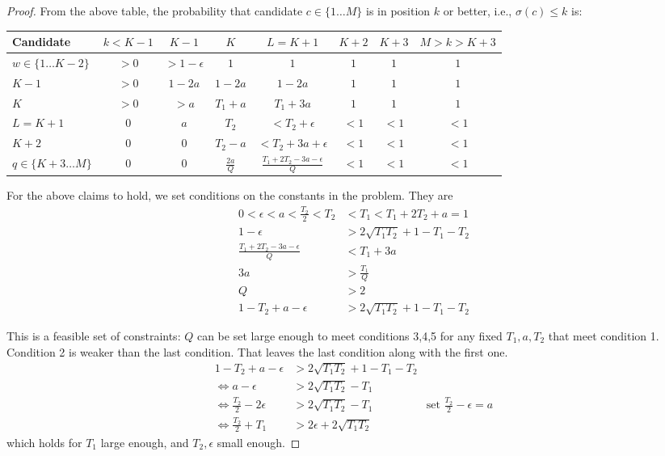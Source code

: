 \documentclass[10pt]{article}
\begin{document}
\begin{ReviewVerbatim}
\begin{proof}
From the above table, the probability that candidate $c\in\{1\dots M\}$ is in position $k$ or better, i.e., $\sigma(c)\leq k$ is:
\FloatBarrier
\begin{table}[h]
	\begin{tabular}{l|ccccccc}
		Candidate              & $k<K-1$ & $K-1$ & $K$ & $L=K+1$ & $K+2$ & $K+3$ & $M>k>K+3$ \\ \hline
	$w\in \{1 \dots K-2\}$		 &  $>0$       &   $>1-\epsilon$    & $1$    &  $1$       &   $1$    &   $1$    &    $1$     \\
	$ K-1$                 &   $>0$      &  $1-2a$     &  $1-2a$   &   $1-2a$      &   $1$    &   $1$    &    $1$     \\
	$K$                  &   $>0$      &  $>a$     &  $T_1 + a$   &     $T_1 + 3a$    &    $1$   &   $1$    &    $1$     \\\hline
	$L=K+1$                &    $0$     &  $a$     & $T_2$    &  $<T_2+\epsilon$      &   $<1$   &   $<1$    &    $<1$      \\
	$K+2$                  &    $0$     &   $0$    &   $T_2-a$  &    $<T_2+3a+\epsilon$     &   $<1$   &   $<1$    &    $<1$         \\
	$q\in\{K+3 \dots M\} $    &    $0$     &   $0$    &   $\frac{2a}{Q}$  &     $\frac{T_1 + 2T_2 -3a -\epsilon}{Q}$    &    $<1$   &   $<1$    &    $<1$
\end{tabular}
\end{table}
\FloatBarrier
{}
For the above claims to hold, we set conditions on the constants in the problem. They are
\begin{align*}
0<\epsilon<a<\frac{T_2}{2}<T_2 &< T_1<T_1 + 2T_2 + a=1\\
%
1 - \epsilon &>2\sqrt{T_1T_2} + 1 - T_1 - T_2\\
\frac{T_1 + 2T_2 -3a -\epsilon}{Q} &< T_1 + 3a\\
3a &> \frac{T_1}{Q}\\
Q&>2\\
1 - T_2 + a - \epsilon &> 2\sqrt{T_1T_2} + 1 - T_1 - T_2
\end{align*}

This is a feasible set of constraints: $Q$ can be set large enough to meet conditions 3,4,5 for any fixed $T_1, a, T_2$ that meet condition 1. Condition 2 is weaker than the last condition. That leaves the last condition along with the first one.
\begin{align*}
1 - T_2 + a - \epsilon &> 2\sqrt{T_1T_2} + 1 - T_1 - T_2\\
\iff a - \epsilon &> 2\sqrt{T_1T_2} - T_1 \\
\iff \frac{T_2}{2} - 2\epsilon &> 2\sqrt{T_1T_2} - T_1 & \text{set } \frac{T_2}{2}-\epsilon = a \\
\iff \frac{T_2}{2} + T_1 &> 2\epsilon + 2\sqrt{T_1T_2}
\end{align*}
which holds for $T_1$ large enough, and $T_2,\epsilon$ small enough.

\end{proof}
\end{ReviewVerbatim}
\end{document}
